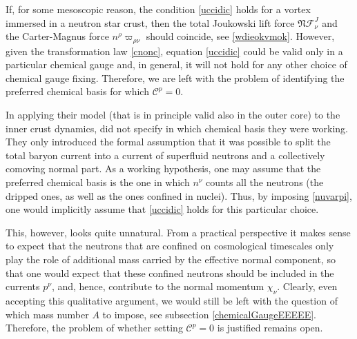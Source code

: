 \documentclass[preprints,article,accept,moreauthors,pdftex]{mdpi}
\begin{document}
If, for some mesoscopic reason, the condition \eqref{uccidic} holds for a vortex immersed in a neutron star crust, then the total Joukowski lift force $\mathfrak{N} \mathcal{F}^J_\nu$ and the Carter-Magnus force 
$ n^\rho \varpi_{ \rho \nu}$ should coincide, see \eqref{wdieokvmok}. 
However, given the transformation law \eqref{cnonc}, equation \eqref{uccidic} could be valid only in a particular chemical gauge and, in general, it will not hold for any other choice of chemical gauge fixing. Therefore, we are left with the problem of identifying the preferred chemical basis for which $\mathcal{C}^p=0$.

In applying their model (that is in principle valid also in the outer core) to the inner crust dynamics, \citet{langlois98} did not specify in which chemical basis they were working. They only introduced the formal assumption that it was possible to split the total baryon current into a current of superfluid neutrons and a collectively comoving normal part. As a working hypothesis, one may assume that the preferred chemical basis is the one in which $n^\nu$ counts all the neutrons (the dripped ones, as well as the ones confined in nuclei). Thus, by imposing \eqref{nuvarpi}, one would implicitly assume that \eqref{uccidic} holds for this particular choice. 

This, however, looks quite unnatural. 
From a practical perspective it makes sense to expect that the neutrons that are confined on cosmological timescales only play the role of additional mass carried by the effective normal component, so that one would expect that these confined neutrons should be included in the currents $p^\nu$, and, hence, contribute to the normal momentum $\chi_\nu$. 
Clearly, even accepting this qualitative argument, we would still be left with the question of which mass number $A$ to impose, see subsection \ref{chemicalGaugeEEEEE}. Therefore, the problem of whether setting $\mathcal{C}^p=0$ is justified remains open.
\end{document}
